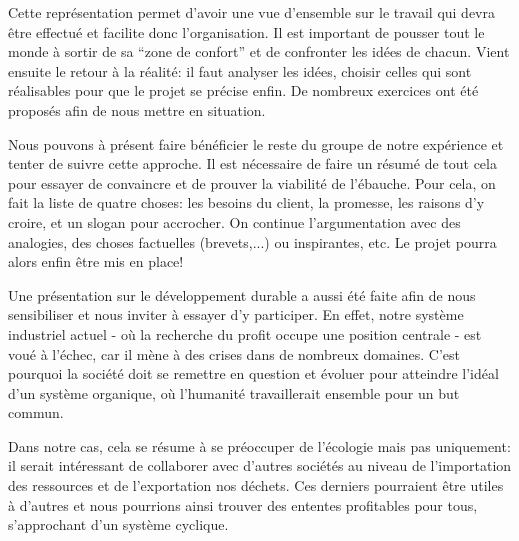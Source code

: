 Cette représentation permet d'avoir une vue d'ensemble sur le travail qui 
devra être effectué et facilite donc l'organisation. Il est important de pousser tout
le monde à sortir de sa ``zone de confort'' et de confronter les idées de chacun.
Vient ensuite le retour à la réalité: il faut analyser les idées, choisir celles qui 
sont réalisables pour que le projet se précise enfin. De nombreux exercices ont été 
proposés afin de nous mettre en situation. 

Nous pouvons à présent faire bénéficier le reste du groupe de notre expérience et tenter
de suivre cette approche. Il est nécessaire de faire un résumé de tout cela pour essayer 
de convaincre et de prouver la viabilité de l'ébauche. Pour cela, on fait la liste 
de quatre choses: les besoins du client, la promesse, les raisons d'y croire, 
et un slogan pour accrocher. On continue l'argumentation avec des analogies,
des choses factuelles (brevets,...) ou inspirantes, etc. Le projet pourra alors
enfin être mis en place!

Une présentation sur le développement durable a aussi été faite afin de nous sensibiliser
et nous inviter à essayer d'y participer. 
En effet, notre système industriel actuel - où la recherche du profit occupe une position
centrale - est voué à l'échec, car il mène à des crises dans de nombreux domaines.
C'est pourquoi la société doit se remettre en question et évoluer pour atteindre
l'idéal d'un système organique, où l'humanité travaillerait ensemble pour un but commun. 

Dans notre cas, cela se résume à se préoccuper de l'écologie mais pas uniquement:
il serait intéressant de collaborer avec d'autres sociétés au niveau de l'importation
des ressources et de l'exportation nos déchets. Ces derniers pourraient être utiles
à d'autres et nous pourrions ainsi trouver des ententes profitables pour tous,
s'approchant d'un système cyclique.

%


